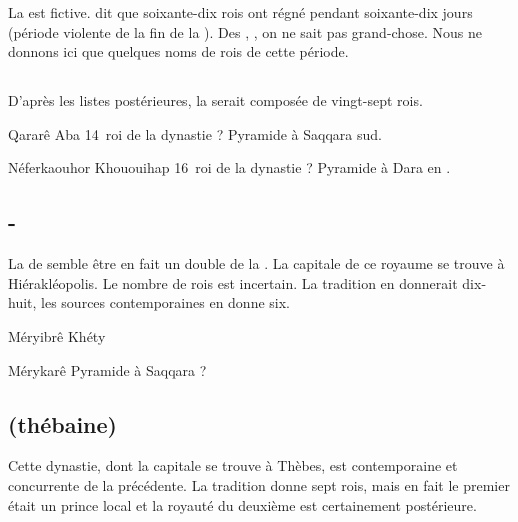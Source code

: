 La  est fictive.  dit que soixante-dix rois 
ont régné pendant soixante-dix jours (période violente de la fin de 
la ).
Des , , on ne sait pas grand-chose. Nous 
ne donnons ici que quelques noms de rois de cette période.

\subsection{\texorpdfstring{}{VIIIe dynastie}}

D'après les listes postérieures, la  serait composée de 
vingt-sept rois.

\begin{listerois}
  \item [Qararê Aba] 14\ieme~roi de la dynastie ? 
        Pyramide à Saqqara sud. \\
  \item [Néferkaouhor Khououihap] 16\ieme~roi de la dynastie ? 
        Pyramide à Dara en \ME.
\end{listerois}

\subsection{\texorpdfstring{-}{IXe-Xe dynastie}}

La  de  semble être en fait un double de la 
. 
La capitale de ce royaume se trouve à Hiérakléopolis. Le nombre de 
rois est incertain. La tradition en donnerait dix-huit, les sources
contemporaines en donne six.

\begin{listerois}
  \item [Méryibrê Khéty]
  \item [Mérykarê] Pyramide à Saqqara ?
\end{listerois}

\subsection{\texorpdfstring{}{XIe dynastie} (thébaine)}

Cette dynastie, dont la capitale se trouve à Thèbes, est contemporaine 
et concurrente de la précédente. La tradition donne sept rois, mais en 
fait le premier était un prince local et la royauté du deuxième est 
certainement postérieure.

